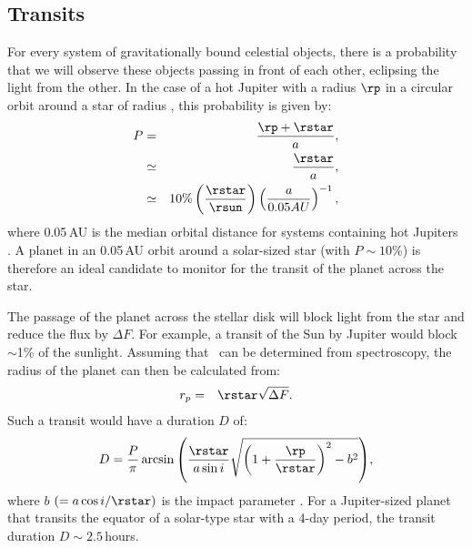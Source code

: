 \subsection{Transits}\label{cha:intro:sec:methods:sub:trans}

For every system of gravitationally bound celestial objects, there is a probability that we will observe these objects passing in front of each other, eclipsing the light from the other.
In the case of a hot Jupiter with a radius $\rp$ in a circular orbit around a star of radius \rstar, this probability is given by:
\begin{eqnarray*}
P & = & \frac{\rp + \rstar}{a},\\
 & \simeq & \frac{\rstar}{a},\\
  & \simeq & 10\% \left( \frac{\rstar}{\rsun} \right) \left( \frac{a}{0.05 AU} \right)^{-1}, %
\end{eqnarray*}
where 0.05\,AU is the median orbital distance for systems containing hot Jupiters \citep{Sackett:POSS:1999a}.
A planet in an 0.05\,AU orbit around a solar-sized star (with $P\sim10$\%) is therefore an ideal candidate to monitor for the transit of the planet across the star.

The passage of the planet across the stellar disk will block light from the star and reduce the flux by $\Delta F$.
For example, a transit of the Sun by Jupiter would block $\sim$1\% of the sunlight.
Assuming that \rstar\ can be determined from spectroscopy, the radius of the planet can then be calculated from:
\begin{eqnarray*}
r_{p} & = & {\rstar} \sqrt{\Delta F}.
\end{eqnarray*}
Such a transit would have a duration $D$ of:
\begin{eqnarray*}
D = \frac{P}{\pi} \arcsin{\left( \frac{\rstar}{a \sin{i}}
\sqrt{\left(1+\frac{\rp}{\rstar}\right)^2 - b^2} \right)}, %
\end{eqnarray*}
where $b$ $(=a\cos{i}/\rstar)$ is the impact parameter \citep{Seager_Mallen-Ornelas:apj:2003a}.
For a Jupiter-sized planet that transits the equator of a solar-type star with a 4-day period, the transit duration $D\sim2.5$\,hours.

